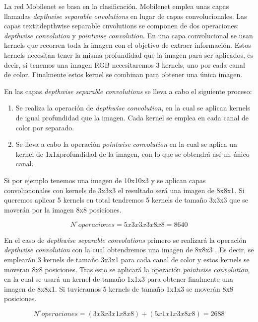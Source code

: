 La red Mobilenet se basa en la clasificación. Mobilenet emplea unas capas llamadas \textit{depthwise separable cnvolutions} en lugar de capas convolucionales. Las capas textit{depthwise separable cnvolutions} se componen de dos operaciones: \textit{depthwise convolution} y \textit{pointwise convolution}. En una capa convolucional se usan kernels que recorren toda la imagen con el objetivo de extraer información. Estos kernels necesitan tener la misma profundidad que la imagen para ser aplicados, es decir, si tenemos una imagen RGB necesitaremos 3 kernels, uno por cada canal de color. Finalmente estos kernel se combinan para obtener una única imagen. 

En las capas \textit{depthwise separable convolutions} se lleva a cabo el siguiente proceso:
\begin{enumerate}
    \item Se realiza la operación de \textit{depthwise convolution}, en la cual se aplican kernels de igual profundidad que la imagen. Cada kernel se emplea en cada canal de color por separado.
    \item Se lleva a cabo la operación \textit{pointwise convolution} en la cual se aplica un kernel de 1x1xprofundidad de la imagen, con lo que se obtendrá así un único canal.
\end{enumerate}

Si por ejemplo tenemos una imagen de 10x10x3 y se aplican capas convolucionales con kernels de 3x3x3 el resultado será una imagen de 8x8x1. Si queremos aplicar 5 kernels en total tendremos 5 kernels de tamaño 3x3x3 que se moverán por la imagen 8x8 posiciones.

\begin{equation}\label{convolucional_formula}
N^{\circ} operaciones = 5x3x3x3x8x8 = 8640
\end{equation}

En el caso de \textit{depthwise separable convolutions} primero se realizará la operación \textit{depthwise convolution} con la cual obtendremos una imagen de 8x8x3 . Es decir, se emplearán 3 kernels de tamaño 3x3x1 para cada canal de color y estos kernels se moveran 8x8 posiciones. Tras esto se aplicará la operación \textit{pointwise convolution}, en la cual se usará un kernel de tamaño 1x1x3 para obtener finalmente una imagen de 8x8x1. Si tuvieramos 5 kernels de tamaño 1x1x3 se moverán 8x8 posiciones.

\begin{equation}\label{mobilenet_formula}
N^{\circ} operaciones = (3x3x3x1x8x8) + (5x1x1x3x8x8) = 2688
\end{equation}

